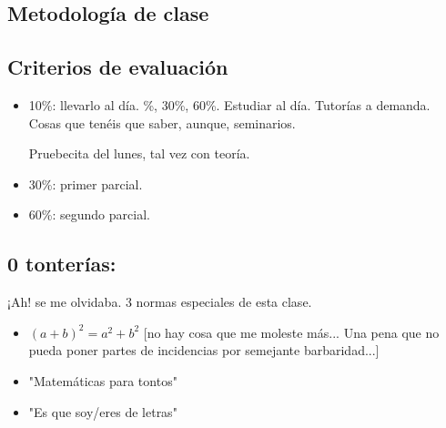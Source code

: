 \documentclass[palatino,nosec]{Docencia}
\begin{document}
\subsection{Metodología de clase}

\subsection{Criterios de evaluación}


\begin{itemize}
	\item 10\%: llevarlo al día.
	    \%, 30\%, 60\%. Estudiar al día. Tutorías a demanda. Cosas que tenéis que saber, aunque, seminarios.

    	\subitem Pruebecita del lunes, tal vez con teoría.

	\item 30\%: primer parcial.
	\item 60\%: segundo parcial.
\end{itemize}

\subsection{0 tonterías:} ¡Ah! se me olvidaba. 3 normas especiales de esta clase.

\begin{itemize}
	\item $(a+b)^2 = a^2 + b^2$ [no hay cosa que me moleste más... Una pena que no pueda poner partes de incidencias por semejante barbaridad...]
	\item "Matemáticas para tontos"
	\item "Es que soy/eres de letras"
\end{itemize}







\printindex
\end{document}
